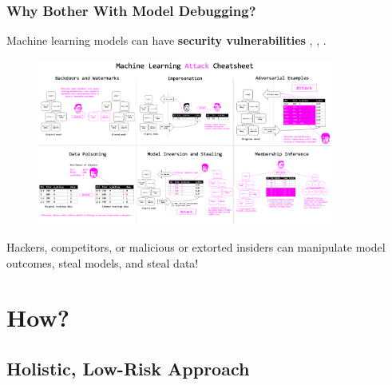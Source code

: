 \documentclass[11pt,
               aspectratio=43,
               hyperref={colorlinks}
               ]{beamer}
\begin{document}
			\begin{frame}
		
				\frametitle{Why Bother With Model Debugging?}
		
				\footnotesize{Machine learning models can have \textbf{security vulnerabilities} \cite{security_of_ml}, \cite{membership_inference}, \cite{model_stealing}}.
				\begin{figure}[htb]
					\begin{center}
						\includegraphics[height=155pt]{img/cheatsheet.png}
					\end{center}
				\end{figure}	
				\vspace{-17pt}
				\footnotesize{Hackers, competitors, or malicious or extorted insiders can manipulate model outcomes, steal models, and steal data!}
				\normalsize
		
			\end{frame}

	\section{How?}

		\subsection{Holistic, Low-Risk Approach}
	
\end{document}
